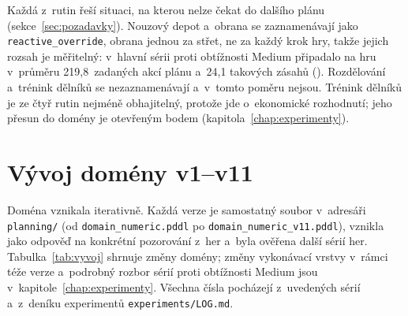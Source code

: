 Každá z~rutin řeší situaci, na kterou nelze čekat do dalšího plánu (sekce~\ref{sec:pozadavky}). Nouzový depot a~obrana se zaznamenávají jako \texttt{reactive\_override}, obrana jednou za střet, ne za každý krok hry, takže jejich rozsah je měřitelný: v~hlavní sérii proti obtížnosti Medium připadalo na hru v~průměru 219,8~zadaných akcí plánu a~24,1 takových zásahů (). Rozdělování a~trénink dělníků se nezaznamenávají a~v~tomto poměru nejsou. Trénink dělníků je ze čtyř rutin nejméně obhajitelný, protože jde o~ekonomické rozhodnutí; jeho přesun do domény je otevřeným bodem (kapitola~\ref{chap:experimenty}).

\section{Vývoj domény v1--v11}
\label{sec:vyvoj}

Doména vznikala iterativně. Každá verze je samostatný soubor v~adresáři \texttt{planning/} (od \texttt{domain\_numeric.pddl} po \texttt{domain\_numeric\_v11.pddl}), vznikla jako odpověď na konkrétní pozorování z~her a~byla ověřena další sérií her. Tabulka~\ref{tab:vyvoj} shrnuje změny domény; změny vykonávací vrstvy v~rámci téže verze a~podrobný rozbor sérií proti obtížnosti Medium jsou v~kapitole~\ref{chap:experimenty}. Všechna čísla pocházejí z~uvedených sérií a~z~deníku experimentů \texttt{experiments/LOG.md}.

